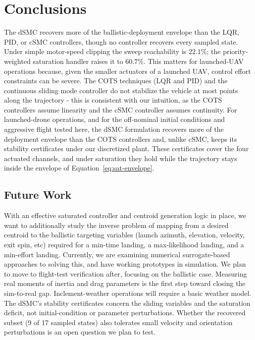 \documentclass[conf]{new-aiaa}
\begin{document}
\section{Conclusions}
The dSMC recovers more of the ballistic-deployment envelope than the LQR, PID, or cSMC controllers, though no controller recovers every sampled state. Under simple motor-speed clipping the sweep reachability is $22.1\%$; the priority-weighted saturation handler raises it to $60.7\%$. This matters for launched-UAV operations because, given the smaller actuators of a launched UAV, control effort constraints can be severe. The COTS techniques (LQR and PID) and the continuous sliding mode controller do not stabilize the vehicle at most points along the trajectory - this is consistent with our intuition, as the COTS controllers assume linearity and the cSMC controller assumes continuity. For launched-drone operations, and for the off-nominal initial conditions and aggressive flight tested here, the dSMC formulation recovers more of the deployment envelope than the COTS controllers and, unlike cSMC, keeps its stability certificates under our discretized plant. These certificates cover the four actuated channels, and under saturation they hold while the trajectory stays inside the envelope of Equation~\ref{eq:sat-envelope}.

\subsection{Future Work}
With an effective saturated controller and centroid generation logic in place, we want to additionally study the inverse problem of mapping from a desired centroid to the ballistic targeting variables (launch azimuth, elevation, velocity, exit spin, etc) required for a min-time landing, a max-likelihood landing, and a min-effort landing. Currently, we are examining numerical surrogate-based approaches to solving this, and have working prototypes in simulation. We plan to move to flight-test verification after, focusing on the ballistic case. Measuring real moments of inertia and drag parameters is the first step toward closing the sim-to-real gap. Inclement-weather operations will require a basic weather model. The dSMC's stability certificates concern the sliding variables and the saturation deficit, not initial-condition or parameter perturbations. Whether the recovered subset (9 of 17 sampled states) also tolerates small velocity and orientation perturbations is an open question we plan to test.

\end{document}
